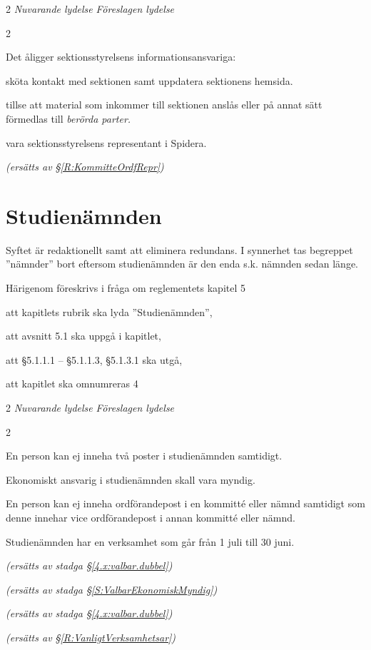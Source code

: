 \documentclass{article}
\newenvironment{lydelse}
    {\begin{paracol}{2}%
        \emph{Nuvarande lydelse}%
        \switchcolumn%
        \emph{Föreslagen lydelse}%
    \end{paracol}%
    \begin{enumerate}[label=\thesubsection.\arabic*]%
    \begin{paracol}{2}%
    }{\end{paracol}\end{enumerate}}
\begin{document}
\begin{lydelse}
    \item Det åligger sektionsstyrelsens informationsansvariga:  
    \begin{aligganden}
        \item sköta kontakt med sektionen samt uppdatera sektionens hemsida. 
        \item tillse att material som inkommer till sektionen anslås eller på annat sätt förmedlas till \emph{berörda parter.}\vspace{0.2em}
        \item vara sektionsstyrelsens representant i Spidera.
    \end{aligganden}
    
    \item[] \emph{(ersätts av \S\ref{R:KommitteOrdfRepr})}
\end{lydelse}


\section{Studienämnden}
Syftet är redaktionellt samt att eliminera redundans.
I synnerhet tas begreppet ''nämnder'' bort eftersom studienämnden är den enda s.k. nämnden sedan länge.

Härigenom föreskrivs i fråga om reglementets kapitel 5

\begin{dels}
    \item att kapitlets rubrik ska lyda ''Studienämnden'',
    \item att avsnitt 5.1 ska uppgå i kapitlet,
    \item att \S 5.1.1.1 -- \S 5.1.1.3, \S 5.1.3.1 ska utgå,
    \item att kapitlet ska omnumreras 4
\end{dels}

\begin{lydelse}

    \item[5.1.1.1] En person kan ej inneha två poster i studienämnden samtidigt.
	\item[5.1.1.2] Ekonomiskt ansvarig i studienämnden skall vara myndig.
	\item[5.1.1.3] En person kan ej inneha ordförandepost i en kommitté eller nämnd samtidigt som denne innehar vice ordförandepost i annan kommitté eller nämnd.
	\item[5.1.3.1] Studienämnden har en verksamhet som går från 1 juli till 30 juni.
    \switchcolumn
    \item[] \emph{(ersätts av stadga \S\ref{4.x:valbar.dubbel})} \vspace{1.3em}
    \item[] \emph{(ersätts av stadga \S\ref{S:ValbarEkonomiskMyndig})} \vspace{1em}
    \item[] \emph{(ersätts av stadga \S\ref{4.x:valbar.dubbel})}\vspace{2.5em}
    \item[] \emph{(ersätts av \S\ref{R:VanligtVerksamhetsar})}
    
\end{lydelse}
\end{document}
